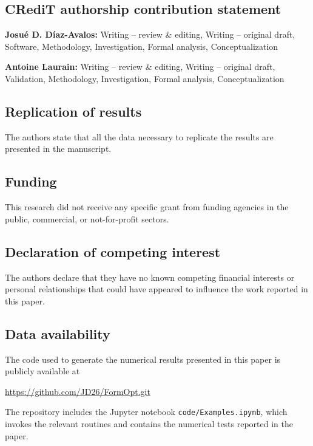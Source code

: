 \documentclass[preprint,9pt]{elsarticle}
\begin{document}
\subsection*{\textbf{CRediT authorship contribution statement}}

\textbf{Josu\'e D. D\'iaz-Avalos:}
Writing -- review \& editing, Writing -- original draft,
Software, Methodology, Investigation,
Formal analysis, Conceptualization

\textbf{Antoine Laurain:}
Writing -- review \& editing, Writing -- original draft,
Validation, Methodology, Investigation,
Formal analysis, Conceptualization

\subsection*{\textbf{Replication of results}}

The authors state that all the data necessary to replicate
the results are presented in the manuscript.

\subsection*{\textbf{Funding}}

This research did not receive any specific grant from funding
agencies in the public, commercial, or not-for-profit sectors.

\subsection*{\textbf{Declaration of competing interest}}

The authors declare that they have no known competing
financial interests or personal relationships that could have appeared
to influence the work reported in this paper.

\subsection*{\textbf{Data availability}}

The code used to generate
the numerical results presented in this paper is publicly available at
\begin{center}
\url{https://github.com/JD26/FormOpt.git}
\end{center}
The repository includes the Jupyter notebook \texttt{code/Examples.ipynb},
which invokes the relevant routines and contains the numerical tests
reported in the paper.


 

\end{document}
